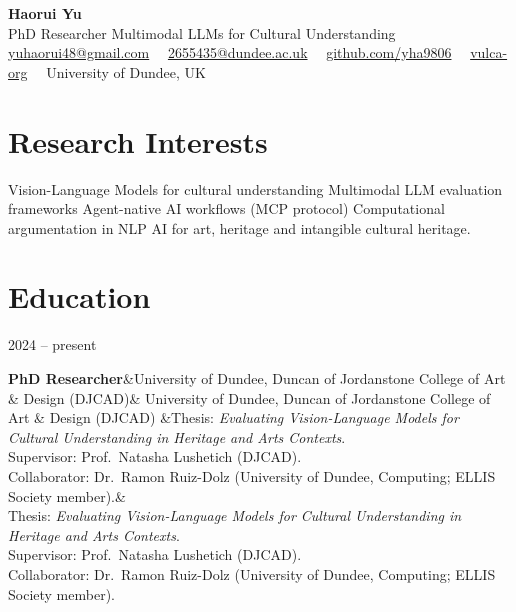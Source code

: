\documentclass[10.5pt,a4paper]{article}
\newcommand{\cvname}[1]{{\Huge\bfseries\color{ink}#1}}
\newcommand{\cvtagline}[1]{{\color{muted}\large #1}}
\newcommand{\cventry}[4]{%
  \noindent\begin{minipage}[t]{0.18\linewidth}\color{muted}\small #1\end{minipage}%
  \begin{minipage}[t]{0.80\linewidth}%
    \textbf{#2}\ifx&#3&\else{} \textperiodcentered{} {\color{muted}#3}\fi%
    \ifx&#4&\else\\[2pt]\small #4\fi%
  \end{minipage}\\[6pt]%
}
\begin{document}
\begin{center}
\cvname{Haorui Yu}\\[6pt]
\cvtagline{PhD Researcher \textperiodcentered{} Multimodal LLMs for Cultural Understanding}\\[10pt]
{\color{muted}
\href{mailto:yuhaorui48@gmail.com}{yuhaorui48@gmail.com}
\ \textperiodcentered\
\href{mailto:2655435@dundee.ac.uk}{2655435@dundee.ac.uk}
\ \textperiodcentered\
\href{https://github.com/yha9806}{github.com/yha9806}
\ \textperiodcentered\
\href{https://github.com/vulca-org}{vulca-org}
\ \textperiodcentered\
University of Dundee, UK
}
\end{center}

\vspace{4pt}

\section*{Research Interests}

\noindent Vision-Language Models for cultural understanding \textperiodcentered{}
Multimodal LLM evaluation frameworks \textperiodcentered{}
Agent-native AI workflows (MCP protocol) \textperiodcentered{}
Computational argumentation in NLP \textperiodcentered{}
AI for art, heritage and intangible cultural heritage.

\section*{Education}

\cventry{2024 – present}
  {PhD Researcher}
  {University of Dundee, Duncan of Jordanstone College of Art \& Design (DJCAD)}
  {Thesis: \emph{Evaluating Vision-Language Models for Cultural Understanding in Heritage and Arts Contexts}.\\
   Supervisor: Prof.~Natasha Lushetich (DJCAD).\\
   Collaborator: Dr.~Ramon Ruiz-Dolz (University of Dundee, Computing; ELLIS Society member).}

\end{document}
